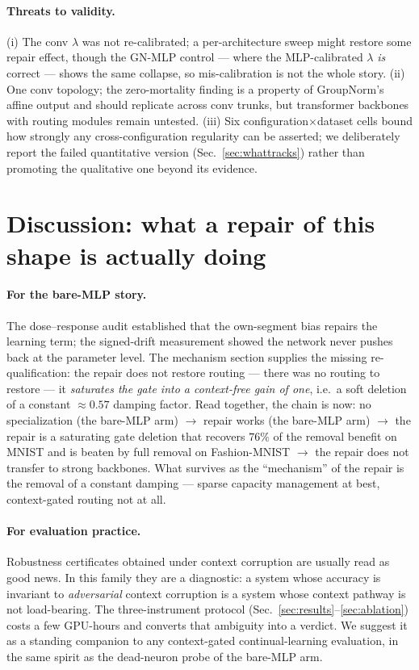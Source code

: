\documentclass[10pt]{article}
\begin{document}
\paragraph{Threats to validity.} (i) The conv $\lambda$ was not
re-calibrated; a per-architecture sweep might restore some repair
effect, though the GN-MLP control --- where the MLP-calibrated
$\lambda$ \emph{is} correct --- shows the same collapse, so
mis-calibration is not the whole story. (ii) One conv topology; the
zero-mortality finding is a property of GroupNorm's affine output and
should replicate across conv trunks, but transformer backbones with
routing modules remain untested. (iii) Six configuration$\times$dataset
cells bound how strongly any cross-configuration regularity can be
asserted; we deliberately report the failed quantitative version
(Sec.~\ref{sec:whattracks}) rather than promoting the qualitative one
beyond its evidence.



\section{Discussion: what a repair of this shape is actually doing}
\label{sec:repair-disc}

\paragraph{For the bare-MLP story.} The dose--response audit established that
the own-segment bias repairs the learning term; the signed-drift measurement showed the network never pushes back at the parameter level.
The mechanism section supplies the missing re-qualification: the repair does not
restore routing --- there was no routing to restore --- it \emph{saturates
the gate into a context-free gain of one}, i.e.\ a soft deletion of a
constant ${\approx}0.57$ damping factor. Read together, the chain is
now: no specialization (the bare-MLP arm) $\to$ repair works (the bare-MLP arm) $\to$ the repair is
a saturating gate deletion that recovers $76\%$ of the removal benefit
on MNIST and is beaten by full removal on Fashion-MNIST $\to$ the repair does not transfer to strong backbones. What
survives as the ``mechanism'' of the repair is the removal of a constant
damping --- sparse capacity management at best, context-gated routing
not at all.

\paragraph{For evaluation practice.} Robustness certificates obtained
under context corruption are usually read as good news. In this family
they are a diagnostic: a system whose accuracy is invariant to
\emph{adversarial} context corruption is a system whose context pathway
is not load-bearing. The three-instrument protocol
(Sec.~\ref{sec:results}--\ref{sec:ablation}) costs a few GPU-hours and
converts that ambiguity into a verdict. We suggest it as a standing
companion to any context-gated continual-learning evaluation, in the
same spirit as the dead-neuron probe of the bare-MLP arm.
\end{document}
